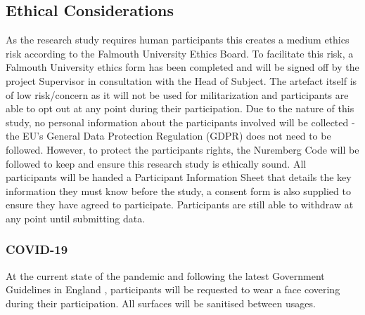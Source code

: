 \subsection{Ethical Considerations}\label{ethics}
As the research study requires human participants this creates a medium ethics risk according to the Falmouth University Ethics Board. To facilitate this risk, a Falmouth University ethics form has been completed and will be signed off by the project Supervisor in consultation with the Head of Subject. The artefact itself is of low risk/concern as it will not be used for militarization and participants are able to opt out at any point during their participation.
Due to the nature of this study, no personal information about the participants involved will be collected - the EU's General Data Protection Regulation (GDPR)\cite{gdpr} does not need to be followed. However, to protect the participants rights, the Nuremberg Code will be followed to keep and ensure this research study is ethically sound\cite{nuremberg-code}. All participants will be handed a Participant Information Sheet that details the key information they must know before the study, a consent form is also supplied to ensure they have agreed to participate. Participants are still able to withdraw at any point until submitting data.
\subsubsection*{COVID-19}
At the current state of the pandemic and following the latest Government Guidelines in England \cite{gov-guidlines}, participants will be requested to wear a face covering during their participation. All surfaces will be sanitised between usages.